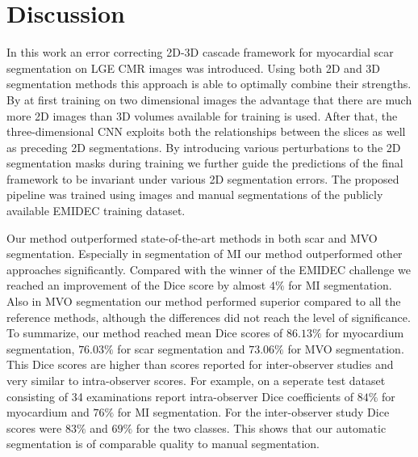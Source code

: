 \documentclass[preprint,5p,authoryear]{elsarticle}
\begin{document}
\section{Discussion}
\label{sec:discussion}

In this work an error correcting 2D-3D cascade framework for myocardial scar segmentation on LGE CMR images was introduced. Using both 2D and 3D segmentation methods this approach is able to optimally combine their strengths. By at first training on two dimensional images the advantage that there are much more 2D images than 3D volumes available for training is used. After that, the three-dimensional CNN exploits both the relationships between the slices as well as preceding 2D segmentations. By introducing various perturbations to the 2D segmentation masks during training we further guide the predictions of the final framework to be invariant under various 2D segmentation errors. The proposed pipeline was trained using images and manual segmentations of the publicly available EMIDEC training dataset. 

Our method outperformed state-of-the-art methods in both scar and MVO segmentation. Especially in segmentation of MI our method outperformed other approaches significantly. Compared with the winner of the EMIDEC challenge \citep{zhang2021cascaded} we reached an improvement of the Dice score by almost $4 \%$ for MI segmentation. Also in MVO segmentation our method performed superior compared to all the reference methods, although the differences did not reach the level of significance. To summarize, our method reached mean Dice scores of $86.13 \%$ for myocardium segmentation, $76.03 \%$ for scar segmentation and $73.06 \%$ for MVO segmentation. This Dice scores are higher than scores reported for inter-observer studies and very similar to intra-observer scores. For example, on a seperate test dataset consisting of 34 examinations \cite{eimdec_dataset} report intra-observer Dice coefficients of $84\%$ for myocardium and $76\%$ for MI segmentation. For the inter-observer study Dice scores were $83\%$ and  $69 \%$ for the two classes. This shows that our automatic segmentation is of comparable quality to manual segmentation. 
\end{document}
